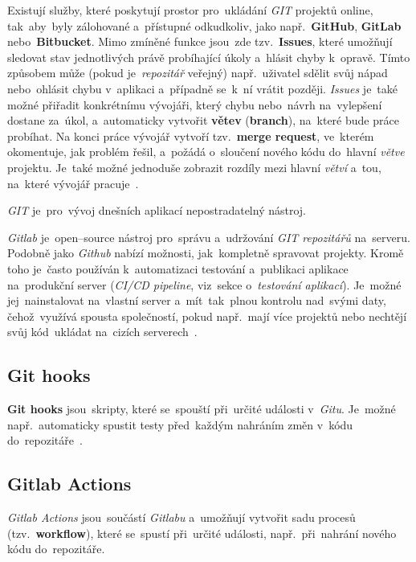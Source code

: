 \documentclass[11pt,a4paper]{report}
\begin{document}
            Existují služby, které poskytují prostor pro~ukládání \emph{GIT} projektů online, tak~aby~byly zálohované a~přístupné odkudkoliv, jako např.~\textbf{GitHub}, \textbf{GitLab} nebo~\textbf{Bitbucket}. Mimo zmíněné funkce jsou~zde tzv.~\textbf{Issues}, které umožňují sledovat stav jednotlivých právě probíhající úkoly a~hlásit chyby k~opravě. Tímto způsobem může (pokud je~\emph{repozitář} veřejný) např.~uživatel sdělit svůj nápad nebo~ohlásit chybu v~aplikaci a~případně se~k~ní vrátit později. \emph{Issues} je~také možné přiřadit konkrétnímu vývojáři, který chybu nebo~návrh na~vylepšení dostane za~úkol, a~automaticky vytvořit \textbf{větev} (\textbf{branch}), na~které bude práce probíhat. Na konci práce vývojář vytvoří tzv.~\textbf{merge request}, ve~kterém okomentuje, jak problém řešil, a~požádá o~sloučení nového kódu do~hlavní \emph{větve} projektu. Je~také možné jednoduše zobrazit rozdíly mezi hlavní \emph{větví} a~tou, na~které vývojář pracuje~\cite{gitscmBook}.
            
            \emph{GIT} je~pro~vývoj dnešních aplikací nepostradatelný nástroj.
            
            \emph{Gitlab} je~open--source nástroj pro~správu a~udržování \emph{GIT repozitářů} na~serveru. Podobně jako \emph{Github} nabízí možnosti, jak~kompletně spravovat projekty. Kromě toho je~často používán k~automatizaci testování a~publikaci aplikace na~produkční server (\emph{CI/CD pipeline}, viz~sekce o~\emph{testování aplikací}). Je~možné jej~nainstalovat na~vlastní server a~mít~tak~plnou kontrolu nad~svými daty, čehož~využívá spousta společností, pokud např.~mají více projektů nebo nechtějí svůj kód~ukládat na~cizích serverech~\cite{gitlab:panek2019optimalizace, gitlab:CICD, gitlab:actions}.

            \subsection{Git hooks}
                \textbf{Git hooks} jsou~skripty, které se~spouští při~určité události v~\emph{Gitu}. Je~možné např.~automaticky spustit testy před~každým nahráním změn v~kódu do~repozitáře~\cite{gitscmBook}.

            \subsection{Gitlab Actions}
                \emph{Gitlab Actions} jsou~součástí \emph{Gitlabu} a~umožňují vytvořit sadu procesů (tzv.~\textbf{workflow}), které se~spustí při~určité události, např.~při~nahrání nového kódu do~repozitáře.
                
\end{document}
